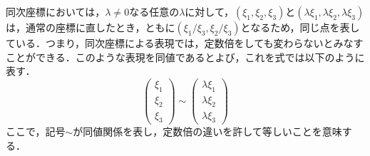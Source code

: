 \documentclass[openright]{nitocs}
\numberwithin{equation}{section}
\begin{document}
                同次座標においては，$\lambda\neq0$なる任意の$\lambda$に対して，$(\xi_1,\xi_2,\xi_3)$と$(\lambda\xi_1,\lambda\xi_2,\lambda\xi_3)$は，通常の座標に直したとき，ともに$(\xi_1/\xi_3,\xi_2/\xi_3)$となるため，同じ点を表している．つまり，同次座標による表現では，定数倍をしても変わらないとみなすことができる．このような表現を同値であるとよび，これを式では以下のように表す．
                \begin{equation} %
                    \left(
                        \begin{array}{ccc}
                            \xi_1\\
                            \xi_2\\
                            \xi_3
                        \end{array}
                    \right) \sim %
                    \left(
                        \begin{array}{ccc}
                            \lambda\xi_1\\
                            \lambda\xi_2\\
                            \lambda\xi_3
                        \end{array}
                    \right)
                \end{equation}
                ここで，記号$\sim$が同値関係を表し，定数倍の違いを許して等しいことを意味する．
\end{document}
